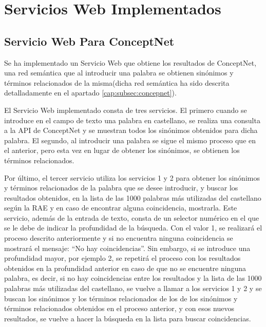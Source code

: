 \chapter{Servicios Web Implementados}
\label{cap:serviciosWebImplementados}


\section{Servicio Web Para ConceptNet}
\label{cap:sec:servicioConceptnet}

Se ha implementado un Servicio Web que obtiene los resultados de ConceptNet, una red semántica que al introducir una palabra se obtienen sinónimos y términos relacionados de la misma(dicha red semántica ha sido descrita detalladamente en el apartado \ref{cap:subsec:concepnet}).

El Servicio Web implementado consta de tres servicios. El primero cuando se introduce en el campo de texto una palabra en castellano, se realiza una consulta a la API de ConceptNet y se muestran todos los sinónimos obtenidos para dicha palabra. El segundo, al introducir una palabra se sigue el mismo proceso que en el anterior, pero esta vez en lugar de obtener los sinónimos, se obtienen los términos relacionados.

Por último, el tercer servicio utiliza los servicios 1 y 2 para obtener los sinónimos y términos relacionados de la palabra que se desee introducir, y buscar los resultados obtenidos, en la lista de las 1000 palabras más utilizadas del castellano según la RAE y en caso de encontrar alguna coincidencia, mostrarla. Este servicio, además de la entrada de texto, consta de un selector numérico en el que se le debe de indicar la profundidad de la búsqueda. Con el valor 1, se realizará el proceso descrito anteriormente y si no encuentra ninguna coincidencia se mostrará el mensaje: ``No hay coincidencias''. Sin embargo, si se introduce una profundidad mayor, por ejemplo 2, se repetirá el proceso con los resultados obtenidos en la profundidad anterior en caso de que no se encuentre ninguna palabra, es decir, si no hay coincidencias entre los resultados y la lista de las 1000 palabras más utilizadas del castellano, se vuelve a llamar a los servicios 1 y 2 y se buscan los sinónimos y los términos relacionados de los de los sinónimos y términos relacionados obtenidos en el proceso anterior, y con esos nuevos resultados, se vuelve a hacer la búsqueda en la lista para buscar coincidencias.


